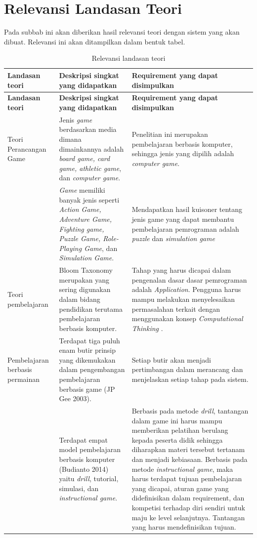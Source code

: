 \section{Relevansi Landasan Teori}
Pada subbab ini akan diberikan hasil relevansi teori dengan sistem yang akan dibuat. Relevansi ini akan ditampilkan dalam bentuk tabel.
\begin{longtable}{| p{2cm} | p{5cm} | p{5cm} |}
	\caption{Relevansi landasan teori} \\
	\hline
	\textbf{Landasan teori} & \textbf{Deskripsi singkat yang didapatkan} & \textbf{Requirement yang dapat disimpulkan} \\
	\hline
	\endfirsthead
		\hline
		\textbf{Landasan teori} & \textbf{Deskripsi singkat yang didapatkan} & \textbf{Requirement yang dapat disimpulkan} \\
		\hline
		\endhead
		Teori Perancangan Game & Jenis \textit{game} berdasarkan media dimana dimainkannya adalah \textit{board game, card game, athletic game}, dan \textit{computer game}. & Penelitian ini merupakan pembelajaran berbasis komputer, sehingga jenis yang dipilih adalah \textit{computer game}. \\
		\hline
		& \textit{Game} memiliki banyak jenis seperti \textit{Action Game, Adventure Game, Fighting game, Puzzle Game, Role-Playing Game}, dan \textit{Simulation Game}. & Mendapatkan hasil kuisoner tentang jenis game yang dapat membantu pembelajaran pemrograman adalah \textit{puzzle} dan \textit{simulation game}\\
		\hline
		Teori pembelajaran & Bloom Taxonomy merupakan yang sering digunakan dalam bidang pendidikan terutama pembelajaran berbasis komputer. & Tahap yang harus dicapai dalam pengenalan dasar dasar pemrograman adalah \textit{Application}. Pengguna harus mampu melakukan menyelesaikan permasalahan terkait dengan menggunakan konsep \textit{Computational Thinking }. \\
		\hline
		Pembelajaran berbasis permainan & Terdapat tiga puluh enam butir prinsip yang dikemukakan dalam pengembangan pembelajaran berbasis game (JP Gee 2003). & Setiap butir akan menjadi pertimbangan dalam merancang dan menjelaskan setiap tahap pada sistem. \\
		\hline
		& Terdapat empat model pembelajaran berbasis komputer (Budianto 2014) yaitu \textit{drill}, tutorial, simulasi, dan \textit{instructional game}. & Berbasis pada metode \textit{drill}, tantangan dalam  game ini harus mampu memberikan pelatihan berulang kepada peserta didik sehingga diharapkan materi tersebut tertanam dan menjadi kebiasaan. Berbasis pada metode \textit{instructional game}, maka harus terdapat tujuan pembelajaran yang dicapai, aturan game yang didefinisikan dalam requirement, dan kompetisi terhadap diri sendiri untuk maju ke level selanjutnya. Tantangan yang harus mendefinisikan tujuan. \\

\end{longtable}
